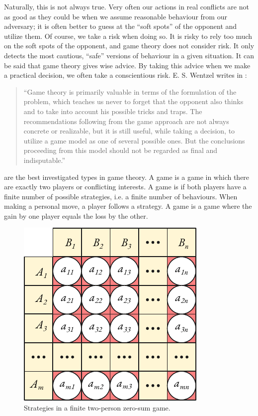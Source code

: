 Naturally, this is not always true. Very often our actions in real
conflicts are not as good as they could be when we assume reasonable
behaviour from our adversary; it is often better to guess at the ``soft
spots'' of the opponent and utilize them. Of course, we take a risk when
doing so. It is risky to rely too much on the soft spots of the opponent,
and game theory does not consider risk. It only detects the most
cautious, ``safe'' versions of behaviour in a given situation. It can be said
that game theory gives wise advice. By taking this advice when we make
a practical decision, we often take a conscientious risk. E. S. Wentzel
writes in : 
\begin{quote}
``Game theory is primarily valuable in
terms of the formulation of the problem, which teaches us never to forget that the opponent also thinks and to take into account his possible tricks and traps. The recommendations following from the
game approach are not always concrete or realizable, but it is still
useful, while taking a decision, to utilize a game model as one of several
possible ones. But the conclusions proceeding from this model should
not be regarded as final and indisputable.''
\end{quote}

  are the best investigated types in game theory. A  game is a game in which there are exactly two players or conflicting interests. A game is  if both players have a finite number of possible strategies, i.e. a finite number of behaviours. When making a personal move, a player
follows a strategy. A  game is a game where the gain by one
player equals the loss by the other.

 \begin{figure}[!h]
 \centering
 \includegraphics[width=0.6\tfwidth]{figures/two-player1.pdf}
\caption{Strategies in a finite two-person zero-sum game.\label{twoplayer1}}
 \end{figure}


